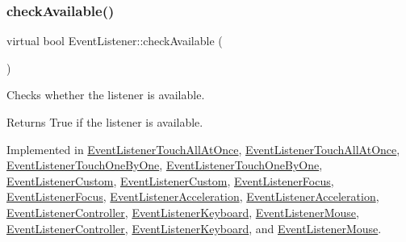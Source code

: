 \mbox{\label{classEventListener_abef02641f86a853c36e063180c18f052}} 
\subsubsection{\texorpdfstring{check\+Available()}{checkAvailable()}\hspace{0.1cm}{\footnotesize\ttfamily [2/2]}}
{\footnotesize\ttfamily virtual bool Event\+Listener\+::check\+Available (\begin{DoxyParamCaption}{ }\end{DoxyParamCaption})\hspace{0.3cm}{\ttfamily [pure virtual]}}

Checks whether the listener is available.

\begin{DoxyReturn}{Returns}
True if the listener is available. 
\end{DoxyReturn}


Implemented in \hyperlink{classEventListenerTouchAllAtOnce_aa694c16160c353ed089ab1b80b003066}{Event\+Listener\+Touch\+All\+At\+Once}, \hyperlink{classEventListenerTouchAllAtOnce_a2bae6413f00f5afbe6dfc39985ec76cf}{Event\+Listener\+Touch\+All\+At\+Once}, \hyperlink{classEventListenerTouchOneByOne_a013a626d35805cc6ca030d9f9883610b}{Event\+Listener\+Touch\+One\+By\+One}, \hyperlink{classEventListenerTouchOneByOne_af14f012850827bf3464369245611c05e}{Event\+Listener\+Touch\+One\+By\+One}, \hyperlink{classEventListenerCustom_a2de79f2f69bd89f68216b5467ed9f50b}{Event\+Listener\+Custom}, \hyperlink{classEventListenerCustom_a9be3f3ad1e20340dda29e33fe06de444}{Event\+Listener\+Custom}, \hyperlink{classEventListenerFocus_acc03526a7e5478b87327f3e8c28ded12}{Event\+Listener\+Focus}, \hyperlink{classEventListenerFocus_a103c10ed16e8ef1ddce0965d1e1c40c6}{Event\+Listener\+Focus}, \hyperlink{classEventListenerAcceleration_aa69415757d82f35612610dc767fd0aab}{Event\+Listener\+Acceleration}, \hyperlink{classEventListenerAcceleration_a3226671264e6e4dd44a29e36986eba11}{Event\+Listener\+Acceleration}, \hyperlink{classEventListenerController_af3f384634b0fa0e0f9d5c3f152aef42b}{Event\+Listener\+Controller}, \hyperlink{classEventListenerKeyboard_a855c94e047e48d3ab419ae43280231c3}{Event\+Listener\+Keyboard}, \hyperlink{classEventListenerMouse_acf0e2a02290738775a08c6032c741d38}{Event\+Listener\+Mouse}, \hyperlink{classEventListenerController_a82ea8138d323671c6811b69deb297da7}{Event\+Listener\+Controller}, \hyperlink{classEventListenerKeyboard_a7f7d0c2e82388278bfc98ff457dc2da8}{Event\+Listener\+Keyboard}, and \hyperlink{classEventListenerMouse_ac60e3ef56883beeb2f8660c921421e63}{Event\+Listener\+Mouse}.

